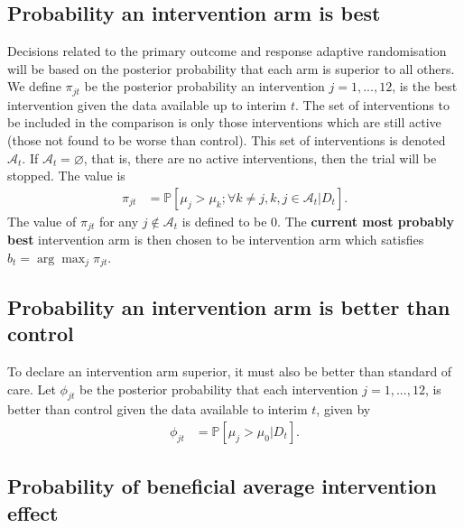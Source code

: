 \documentclass[
  bibliography=totoc]{scrreprt}
\begin{document}
\hypertarget{probability-an-intervention-arm-is-best}{%
\subsection{Probability an intervention arm is best}\label{probability-an-intervention-arm-is-best}}

Decisions related to the primary outcome and response adaptive randomisation will be based on the posterior probability that each arm is superior to all others.
We define \(\pi_{jt}\) be the posterior probability an intervention \(j=1,...,12\), is the best intervention given the data available up to interim \(t\).
The set of interventions to be included in the comparison is only those interventions which are still active (those not found to be worse than control).
This set of interventions is denoted \(\mathcal{A}_t\).
If \(\mathcal{A}_t=\varnothing\), that is, there are no active interventions, then the trial will be stopped.
The value is
\[
\begin{aligned}
\pi_{jt} &= \mathbb P[\mu_j > \mu_k;\forall k\ne j,k,j\in\mathcal{A}_t|D_t].
\end{aligned}
\]
The value of \(\pi_{jt}\) for any \(j\notin\mathcal{A}_t\) is defined to be 0.
The \textbf{current most probably best} intervention arm is then chosen to be intervention arm which satisfies \(b_t = \arg\max_j \pi_{jt}\).

\hypertarget{probability-an-intervention-arm-is-better-than-control}{%
\subsection{Probability an intervention arm is better than control}\label{probability-an-intervention-arm-is-better-than-control}}

To declare an intervention arm superior, it must also be better than standard of care.
Let \(\phi_{jt}\) be the posterior probability that each intervention \(j=1,...,12\), is better than control given the data available to interim \(t\), given by
\[
\begin{aligned}
\phi_{jt} &= \mathbb P[\mu_j > \mu_0|D_t].
\end{aligned}
\]

\hypertarget{probability-of-beneficial-average-intervention-effect}{%
\subsection{Probability of beneficial average intervention effect}\label{probability-of-beneficial-average-intervention-effect}}
\end{document}
